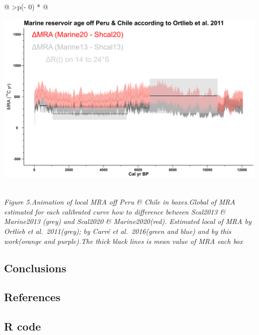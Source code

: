 \documentclass[
]{article}
\begin{document}
\begin{longtable}[]{@{}
  >{\centering\arraybackslash}p{(\columnwidth - 0\tabcolsep) * }@{}}
\toprule
\begin{minipage}[b]{\linewidth}\centering
\href{https://github.com/jasb3110/Radiocarbon-reservoir/blob/8bddc9b0f2d8f839ca2d4826f47d9050d49384aa/animation.gif?raw=true}{\includegraphics{animation.gif?}}
\end{minipage} \\
\midrule
\endhead
\emph{Figure 5.Animation of local MRA off Peru \& Chile in boxes.Global
of MRA estimated for each calibrated curve how to difference between
Scal2013 \& Marine2013 (grey) and Scal2020 \& Marine2020(red). Estimated
local of MRA by Ortlieb et al.~2011(grey); by Carré et al.~2016(green
and blue) and by this work(orange and purple).The thick black lines is
mean value of MRA each box} \\
\bottomrule
\end{longtable}

\hypertarget{conclusions}{%
\subsection{Conclusions}\label{conclusions}}

\hypertarget{references}{%
\subsection{References}\label{references}}

\hypertarget{r-code}{%
\subsection{R code}\label{r-code}}
\end{document}
